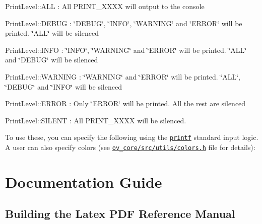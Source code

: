 \begin{DoxyItemize}
\item Print\+Level\+::\+A\+LL \+: All P\+R\+I\+N\+T\+\_\+\+X\+X\+XX will output to the console
\item Print\+Level\+::\+D\+E\+B\+UG \+: \char`\"{}\+D\+E\+B\+U\+G\char`\"{}, \char`\"{}\+I\+N\+F\+O\char`\"{}, \char`\"{}\+W\+A\+R\+N\+I\+N\+G\char`\"{} and \char`\"{}\+E\+R\+R\+O\+R\char`\"{} will be printed. \char`\"{}\+A\+L\+L\char`\"{} will be silenced
\item Print\+Level\+::\+I\+N\+FO \+: \char`\"{}\+I\+N\+F\+O\char`\"{}, \char`\"{}\+W\+A\+R\+N\+I\+N\+G\char`\"{} and \char`\"{}\+E\+R\+R\+O\+R\char`\"{} will be printed. \char`\"{}\+A\+L\+L\char`\"{} and \char`\"{}\+D\+E\+B\+U\+G\char`\"{} will be silenced
\item Print\+Level\+::\+W\+A\+R\+N\+I\+NG \+: \char`\"{}\+W\+A\+R\+N\+I\+N\+G\char`\"{} and \char`\"{}\+E\+R\+R\+O\+R\char`\"{} will be printed. \char`\"{}\+A\+L\+L\char`\"{}, \char`\"{}\+D\+E\+B\+U\+G\char`\"{} and \char`\"{}\+I\+N\+F\+O\char`\"{} will be silenced
\item Print\+Level\+::\+E\+R\+R\+OR \+: Only \char`\"{}\+E\+R\+R\+O\+R\char`\"{} will be printed. All the rest are silenced
\item Print\+Level\+::\+S\+I\+L\+E\+NT \+: All P\+R\+I\+N\+T\+\_\+\+X\+X\+XX will be silenced.
\end{DoxyItemize}

To use these, you can specify the following using the \href{https://www.cplusplus.com/reference/cstdio/printf/}{\tt printf} standard input logic. A user can also specify colors (see \href{ov_core/src/utils/colors.h}{\tt ov\+\_\+core/src/utils/colors.\+h} file for details)\+:


 \hypertarget{dev-docs}{}\section{Documentation Guide}\label{dev-docs}
\hypertarget{dev-docs_developers-pdfmanual}{}\subsection{Building the Latex P\+D\+F Reference Manual}\label{dev-docs_developers-pdfmanual}

